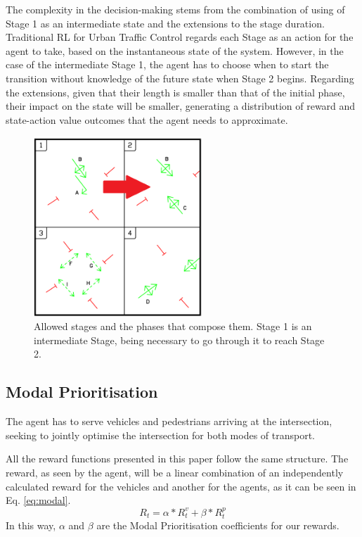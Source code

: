 \documentclass[conference]{IEEEtran}
\begin{document}
The complexity in the decision-making stems from the combination of using of Stage 1 as an intermediate state and the extensions to the stage duration.
Traditional RL for Urban Traffic Control regards each Stage as an action for the agent to take, based on the instantaneous state of the system.
However, in the case of the intermediate Stage 1, the agent has to choose when to start the transition without knowledge of the future state when Stage 2 begins.
Regarding the extensions, given that their length is smaller than that of the initial phase, their impact on the state will be smaller, generating a distribution of reward and state-action value outcomes that the agent needs to approximate.
\begin{figure}                                                
\centering                                                    
\includegraphics[width=2.5in]{phases_limited.png}                                    
\caption{Allowed stages and the phases that compose them. Stage 1 is an intermediate Stage, being necessary to go through it to reach Stage 2.}                                  
\label{intersection}                                               
\end{figure}     

\subsection{Modal Prioritisation}
The agent has to serve vehicles and pedestrians arriving at the intersection, seeking to jointly optimise the intersection for both modes of transport.

All the reward functions presented in this paper follow the same structure.
The reward, as seen by the agent, will be a linear combination of an independently calculated reward for the vehicles and another for the agents, as it can be seen in Eq. \ref{eq:modal}.
\begin{equation}
R_t = \alpha * R^v_t + \beta * R^p_t
\label{eq:modal}
\end{equation}
In this way, $\alpha$ and $\beta$ are the Modal Prioritisation coefficients for our rewards.
\end{document}
